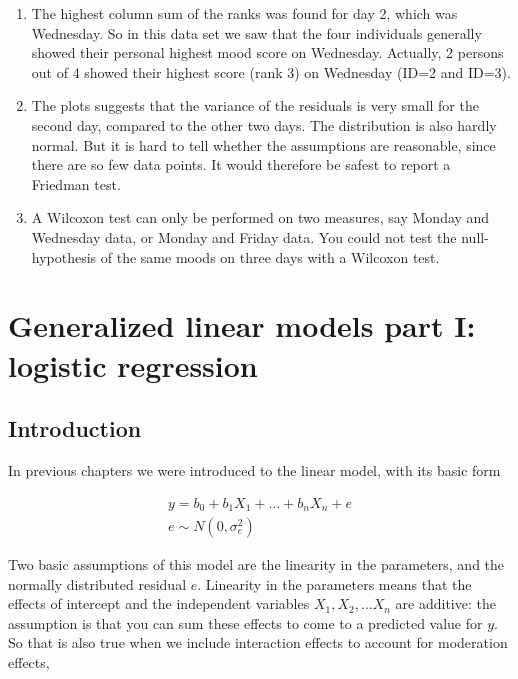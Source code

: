 \documentclass[]{report}\usepackage[]{graphicx}\usepackage[]{color}
\begin{document}
\begin{enumerate}
\item The highest column sum of the ranks was found for day 2, which was Wednesday. So in this data set we saw that the four individuals generally showed their personal highest mood score on Wednesday. Actually, 2 persons out of 4 showed their highest score (rank 3) on Wednesday (ID=2 and ID=3).

\item The plots suggests that the variance of the residuals is very small for the second day, compared to the other two days. The distribution is also hardly normal. But it is hard to tell whether the assumptions are reasonable, since there are so few data points. It would therefore be safest to report a Friedman test.

\item A Wilcoxon test can only be performed on two measures, say Monday and Wednesday data, or Monday and Friday data. You could not test the null-hypothesis of the same moods on three days with a Wilcoxon test.

\end{enumerate}



%




\chapter{Generalized linear models part I: logistic regression}\label{chap:logistic}

\section{Introduction}
In previous chapters we were introduced to the linear model, with its basic form


\begin{eqnarray}
y = b_0 + b_1 X_1 + \dots + b_n X_n + e \\
e \sim N(0, \sigma_e^2)
\end{eqnarray}

Two basic assumptions of this model are the linearity in the parameters, and the normally distributed residual $e$. Linearity in the parameters means that the effects of intercept and the independent variables $X_1, X_2, \dots X_n$ are additive: the assumption is that you can sum these effects to come to a predicted value for $y$. So that is also true when we include interaction effects to account for moderation effects,
\end{document}
